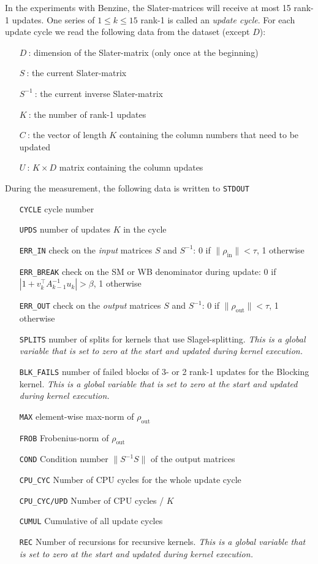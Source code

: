 \documentclass[11pt]{article}
\numberwithin{figure}{section}
\numberwithin{table}{section}
\begin{document}
    	In the experiments with Benzine, the Slater-matrices will receive at most 15 rank-1 updates. One series of $1\leq k \leq15$ rank-1 is called an \emph{update cycle}. For each update cycle we read the following data from the dataset (except $D$):
    	\begin{itemize}
    		\item [$D\:$:] dimension of the Slater-matrix (only once at the beginning)
    		\item [$S\:$:] the current Slater-matrix
    		\item [$S^{-1}\:$:] the current inverse Slater-matrix
    		\item [$K\:$:] the number of rank-1 updates
    		\item [$C\:$:] the vector of length $K$ containing the column numbers that need to be updated
    		\item [$U\:$:] $K\times D$ matrix containing the column updates
    	\end{itemize}
    	During the measurement, the following data is written to \verb|STDOUT|
    	\begin{itemize}
    		\item [\texttt{CYCLE}] cycle number
    		\item [\texttt{UPDS}] number of updates $K$ in the cycle
    		\item [\texttt{ERR\_IN}] check on the \emph{input} matrices $S$ and $S^{-1}$: 0 if $\|\rho_\mathrm{in}\|<\tau$, 1 otherwise
    		\item [\texttt{ERR\_BREAK}] check on the SM or WB denominator during  update: 0 if $\left|1+v_k^\top A_{k-1}^{-1}u_k\right| > \beta$, 1 otherwise
    		\item [\texttt{ERR\_OUT}] check on the \emph{output} matrices $S$ and $S^{-1}$: 0 if $\|\rho_\mathrm{out}\|<\tau$, 1 otherwise
    		\item [\texttt{SPLITS}] number of splits for kernels that use Slagel-splitting. \emph{This is a global variable that is set to zero at the start and updated during kernel execution.}
    		\item [\texttt{BLK\_FAILS}] number of failed blocks of 3- or 2 rank-1 updates for the Blocking kernel. \emph{This is a global variable that is set to zero at the start and updated during kernel execution.}
    		\item [\texttt{MAX}] element-wise max-norm of $\rho_\mathrm{out}$ 
    		\item [\texttt{FROB}] Frobenius-norm of $\rho_\mathrm{out}$ 
    		\item [\texttt{COND}] Condition number $\|S^{-1}S\|$ of the output matrices
    		\item [\texttt{CPU\_CYC}] Number of CPU cycles for the whole update cycle
    		\item [\texttt{CPU\_CYC/UPD}] Number of CPU cycles /  $K$
    		\item [\texttt{CUMUL}] Cumulative of all update cycles
    		\item [\texttt{REC}] Number of recursions for recursive kernels. \emph{This is a global variable that is set to zero at the start and updated during kernel execution.}
    	\end{itemize}
			
\end{document}
